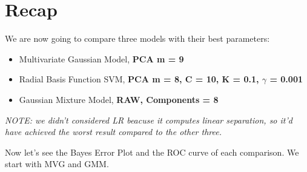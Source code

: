 \documentclass[english]{report}
\begin{document}
\clearpage
\section{Recap}
We are now going to compare three models with their best parameters: 
\begin{itemize}
    \item Multivariate Gaussian Model, \textbf{PCA m = 9}
    \item Radial Basis Function SVM, \textbf{PCA m = 8, C = 10, K = 0.1, $\gamma$ = 0.001}
    \item Gaussian Mixture Model, \textbf{RAW, Components = 8}
\end{itemize}
\textit{NOTE: we didn't considered LR beacuse it computes linear separation, so it'd have achieved the worst
result compared to the other three.}

Now let's see the Bayes Error Plot and the ROC curve of each comparison.
We start with MVG and GMM.
\end{document}
